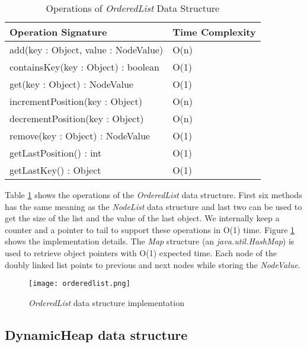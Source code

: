 \begin{table}
\centering
\caption{Operations of \textit{OrderedList} Data Structure}
\begin{tabular}{|l|l|} \hline
Operation Signature & Time Complexity \\ \hline \hline
add(key : Object, value : NodeValue) & O(n) \\ \hline
containsKey(key : Object) : boolean & O(1) \\ \hline
get(key : Object) : NodeValue & O(1) \\ \hline
incrementPosition(key : Object) & O(n) \\ \hline
decrementPosition(key : Object) & O(n) \\ \hline
remove(key : Object) : NodeValue & O(1) \\ \hline
getLastPosition() : int & O(1) \\ \hline
getLastKey() : Object & O(1) \\ \hline
\end{tabular}
\label{orderedlist_api}
\end{table}

Table \ref{orderedlist_api} shows the operations of the \textit{OrderedList} data structure. First six methods has the same meaning as the \textit{NodeList} data structure and last two can be used to get the size of the list and the value of the last object. We internally keep a counter and a pointer to tail to support these operations in O(1) time. Figure \ref{orderedlist_impl} shows the implementation details. The \textit{Map} structure (an \textit{java.util.HashMap}) is used to retrieve object pointers with O(1) expected time. Each node of the doubly linked list points to previous and next nodes while storing the \textit{NodeValue}.


\begin{figure}[!t]
        \centering
        \texttt{[image: orderedlist.png]}
        \caption{\textit{OrderedList} data structure implementation}
        \label{orderedlist_impl}
\end{figure}

\subsection{DynamicHeap data structure}

